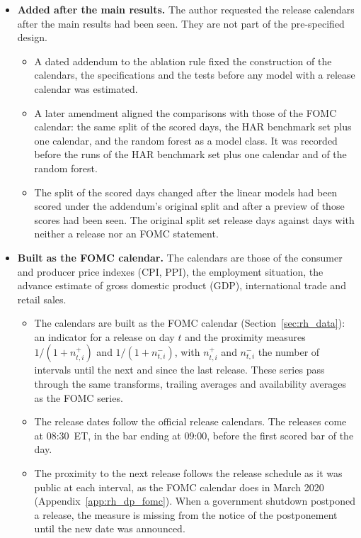 \begin{itemize}
\item \textbf{Added after the main results.} The author requested the release calendars after the main results had
  been seen. They are not part of the pre-specified design.
  \begin{itemize}
  \item A dated addendum to the ablation rule fixed the construction of the calendars, the specifications and the
    tests before any model with a release calendar was estimated.
  \item A later amendment aligned the comparisons with those of the FOMC calendar: the same split of the scored days,
    the HAR benchmark set plus one calendar, and the random forest as a model class. It was recorded before the runs
    of the HAR benchmark set plus one calendar and of the random forest.
  \item The split of the scored days changed after the linear models had been scored under the addendum's original
    split and after a preview of those scores had been seen. The original split set release days against days with
    neither a release nor an FOMC statement.
  \end{itemize}
\item \textbf{Built as the FOMC calendar.} The \rhabNMacReleases{} calendars are those of the consumer and producer
  price indexes (CPI, PPI), the employment situation, the advance estimate of gross domestic product (GDP),
  international trade and retail sales.
  \begin{itemize}
  \item The calendars are built as the FOMC calendar (Section~\ref{sec:rh_data}): an indicator for a release on day
    $t$ and the proximity measures $1/(1+n^{+}_{t,i})$ and $1/(1+n^{-}_{t,i})$, with $n^{+}_{t,i}$ and $n^{-}_{t,i}$
    the number of intervals until the next and since the last release. These series pass through the same
    transforms, trailing averages and availability averages as the FOMC series.
  \item The release dates follow the official release calendars. The releases come at 08:30~ET, in the bar ending at
    09:00, before the first scored bar of the day.
  \item The proximity to the next release follows the release schedule as it was public at each interval, as the
    FOMC calendar does in March 2020 (Appendix~\ref{app:rh_dp_fomc}). When a government shutdown postponed a release,
    the measure is missing from the notice of the postponement until the new date was announced.

\end{itemize}
\end{itemize}
